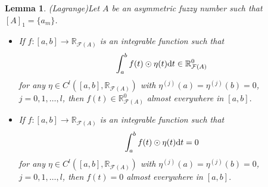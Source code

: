 \documentclass[12pt,a4paper]{article}
\newcommand{\RFA}{\mathbb{R}_{\mathcal{F}(A)}}
\newtheorem{lemma}{Lemma}
\begin{document}
\begin{lemma}(Lagrange)\label{lem:fundamental1}
Let $A$ be an asymmetric fuzzy number such that $[A]_1 = \{a_m\}$. 
\begin{itemize}
\item[(i)] If $f:[a,b]\longrightarrow\RFA$ is an integrable function such that  
\begin{equation}\label{eq:fundamental1a}
\int_{a}^{b} f(t)\odot\eta(t)\textnormal{d}t \in \RFA^0	
\end{equation}
for any $\eta \in C^{l}\left([a,b],\RFA\right)$ with $\eta^{(j)}(a)=\eta^{(j)}(b)=0$, $j=0,1,\dots,l$, then 
$f(t) \in \RFA^0$ almost everywhere in $[a,b].$

 \item[(ii)] If $f:[a,b]\longrightarrow\RFA$ is an integrable function such that  
\begin{equation}\label{eq:fundamental1b}
\int_{a}^{b} f(t)\odot\eta(t)\textnormal{d}t=0	
\end{equation}
for any $\eta \in C^{l}\left([a,b],\RFA\right)$ with $\eta^{(j)}(a)=\eta^{(j)}(b)=0$, $j=0,1,\dots,l$, then 
$f(t) = 0$ almost everywhere in $[a,b].$
\end{itemize}
\end{lemma}
\end{document}
